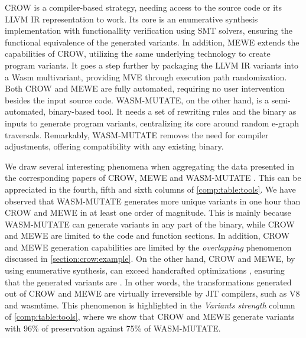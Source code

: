 CROW is a compiler-based strategy, needing access to the source code or its LLVM IR representation to work. 
Its core is an enumerative synthesis implementation with functionallity verification using SMT solvers, ensuring the functional equivalence of the generated variants.
In addition, MEWE extends the capabilities of CROW, utilizing the same underlying technology to create program variants. 
It goes a step further by packaging the LLVM IR variants into a Wasm multivariant, providing MVE through execution path randomization.
Both CROW and MEWE are fully automated, requiring no user intervention besides the input source code.
WASM-MUTATE, on the other hand, is a semi-automated, binary-based tool.
It needs a set of rewriting rules and the \wasm binary as inputs to generate program variants, centralizing its core around random e-graph traversals. 
Remarkably, WASM-MUTATE removes the need for compiler adjustments, offering compatibility with any existing \Wasm binary. 



We draw several interesting phenomena when aggregating the data presented in the corresponding papers of CROW, MEWE and WASM-MUTATE \cite{CROW,MEWE, wasmmutate}. 
This can be appreciated in the fourth, fifth and sixth columns of \autoref{comp:table:tools}.
We have observed that WASM-MUTATE generates more unique variants in one hour than CROW and MEWE in at least one order of magnitude.
This is mainly because WASM-MUTATE can generate variants in any part of the \wasm binary, while CROW and MEWE are limited to the code and function sections.
In addition, CROW and MEWE generation capabilities are limited by the \emph{overlapping} phenomenon discussed in \autoref{section:crow:example}.
On the other hand, CROW and MEWE, by using enumerative synthesis, can exceed handcrafted optimizations \cite{Sasnauskas2017Souper:Superoptimizer}, ensuring that the generated variants are . 
In other words, the transformations generated out of CROW and MEWE are virtually irreversible by JIT compilers, such as V8 and wasmtime.
This phenomenon is highlighted in the \emph{Variants strength} column of \autoref{comp:table:tools}, where we show that CROW and MEWE generate variants with 96\% of preservation against 75\% of WASM-MUTATE.

